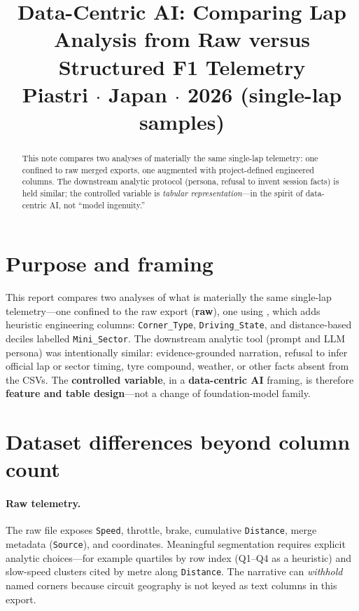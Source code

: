 \documentclass[11pt,a4paper]{article}
\title{Data-Centric AI: Comparing Lap Analysis from Raw versus Structured F1 Telemetry\\[0.3em]
\large Piastri $\cdot$ Japan $\cdot$ 2026 (single-lap samples)}
\author{}\date{}
\begin{document}
\maketitle

\begin{abstract}
This note compares two analyses of materially the same single-lap telemetry: one confined to raw merged exports, one augmented with project-defined engineered columns. The downstream analytic protocol (persona, refusal to invent session facts) is held similar; the controlled variable is \emph{tabular representation}---in the spirit of data-centric AI, not ``model ingenuity.''
\end{abstract}

\section{Purpose and framing}

This report compares two analyses of what is materially the same single-lap telemetry---one confined to the raw export  (\textbf{raw}), one using , which adds heuristic engineering columns: \texttt{Corner\_Type}, \texttt{Driving\_State}, and distance-based deciles labelled \texttt{Mini\_Sector}. The downstream analytic tool (prompt and LLM persona) was intentionally similar: evidence-grounded narration, refusal to infer official lap or sector timing, tyre compound, weather, or other facts absent from the CSVs. The \textbf{controlled variable}, in a \textbf{data-centric AI} framing, is therefore \textbf{feature and table design}---not a change of foundation-model family.

\section{Dataset differences beyond column count}

\paragraph{Raw telemetry.}
The raw file exposes \texttt{Speed}, throttle, brake, cumulative \texttt{Distance}, merge metadata (\texttt{Source}), and coordinates. Meaningful segmentation requires explicit analytic choices---for example quartiles by row index (Q1--Q4 as a heuristic) and slow-speed clusters cited by metre along \texttt{Distance}. The narrative can \emph{withhold} named corners because circuit geography is not keyed as text columns in this export.
\end{document}
